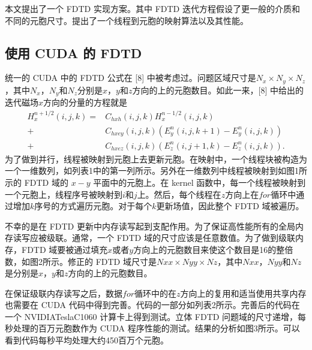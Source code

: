 本文提出了一个 FDTD 实现方案。其中 FDTD 迭代方程假设了更一般的介质和不同的元胞尺寸。提出了一个线程到元胞的映射算法以及其性能。

\subsection{使用 CUDA 的 FDTD}

统一的 CUDA 中的 FDTD 公式在 [8] 中被考虑过。问题区域尺寸是$N_x\times N_y \times N_z$，其中$N_x$，$N_y$和$N_z$分别是$x$，$y$和$z$方向的上的元胞数目。如此一来，[8] 中给出的迭代磁场$x$方向的分量的方程就是
\begin{equation}
\begin{split}
H_{x}^{n+1/2}(i,j,k) =& C_{hxh}(i,j,k)H_{x}^{n-1/2}(i,j,k)\\
+ & C_{hxey}(i,j,k)(E_{y}^{n}(i,j,k+1)-E_{y}^{n}(i,j,k))\\
+ & C_{hxez}(i,j,k)(E_{z}^{n}(i,j+1,k)-E_{z}^{n}(i,j,k)).
\end{split}
\end{equation}
为了做到并行，线程被映射到元胞上去更新元胞。在映射中，一个线程块被构造为一个一维数列，如列表1中的第一列所示。另外在一维数列中线程被映射到如图1所示的 FDTD 域的 $x-y$ 平面中的元胞上。在 kernel 函数中，每一个线程被映射到一个元胞上，线程序号被映射到$i$和$j$上。然后，每个线程在$z$方向上在$for$循环中通过增加$k$序号的方式遍历元胞。对于每个$k$更新场值，因此整个 FDTD 域被遍历。

不幸的是在 FDTD 更新中内存读写起到支配作用。为了保证高性能所有的全局内存读写应被级联。通常，一个 FDTD 域的尺寸应该是任意数值。为了做到级联内存，FDTD 域要被通过填充$x$或者$y$方向上的元胞数目来使这个数目是16的整倍数，如图2所示。修正的 FDTD 域尺寸是$Nxx\times Nyy\times Nz$，其中$Nxx$，$Nyy$和$Nz$是分别是$x$，$y$和$z$方向的上的元胞数目。

在保证级联内存读写之后，数据$for$循环中的在$z$方向上的复用和适当使用共享内存也需要在 CUDA 代码中得到完善。代码的一部分如列表2所示。完善后的代码在一个 NVIDIA\textregistered Tesla\texttrademark C1060 计算卡上得到测试。立体 FDTD 问题域的尺寸递增，每秒处理的百万元胞数作为 CUDA 程序性能的测试。结果的分析如图3所示。可以看到代码每秒平均处理大约450百万个元胞。